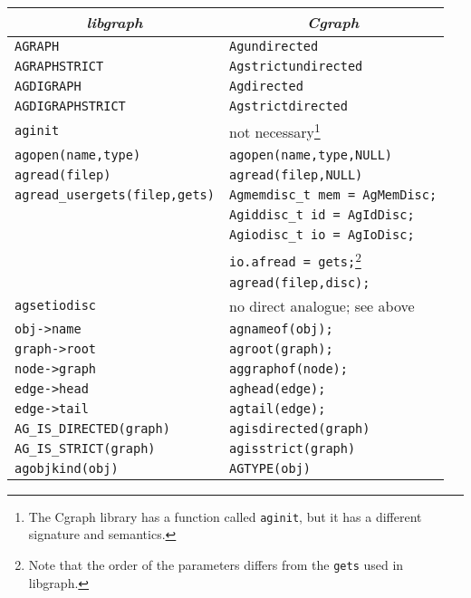 \documentclass[11pt,letterpaper]{article}
\begin{document}
\begin{savenotes}
\begin{table*}[htb]
\centering
\begin{tabular}{|l|l|} \hline
\multicolumn{1}{|c|}{\em libgraph} & \multicolumn{1}{c|}{\em Cgraph} \\ \hline
\verb"AGRAPH"  &  \verb"Agundirected" \\ \hline
\verb"AGRAPHSTRICT" &  \verb"Agstrictundirected" \\ \hline
\verb"AGDIGRAPH" &  \verb"Agdirected" \\ \hline
\verb"AGDIGRAPHSTRICT"  &  \verb"Agstrictdirected" \\ \hline
\verb"aginit" &  not necessary\footnote{The Cgraph library has a function called \texttt{aginit}, but it has a different signature and semantics.} \\ \hline
\verb"agopen(name,type)" &  \verb"agopen(name,type,NULL)"\\ \hline
\verb"agread(filep)" &  \verb"agread(filep,NULL)"\\ \hline
\verb"agread_usergets(filep,gets)" &  \verb"Agmemdisc_t mem = AgMemDisc;" \\
                            &  \verb"Agiddisc_t id = AgIdDisc;" \\
                            &  \verb"Agiodisc_t io = AgIoDisc;" \\
                            &  \verb"io.afread = gets;"\footnote{Note that the order of the parameters differs from the \texttt{gets} used in libgraph.} \\
                            &  \verb"agread(filep,disc);"\\ \hline
\verb"agsetiodisc" &  no direct analogue; see above \\ \hline
\verb"obj->name"   &  \verb"agnameof(obj);" \\ \hline
\verb"graph->root"   &  \verb"agroot(graph);" \\ \hline
\verb"node->graph"   &  \verb"aggraphof(node);" \\ \hline
\verb"edge->head"   &  \verb"aghead(edge);" \\ \hline
\verb"edge->tail"   &  \verb"agtail(edge);" \\ \hline
\verb"AG_IS_DIRECTED(graph)" &  \verb"agisdirected(graph)"  \\ \hline
\verb"AG_IS_STRICT(graph)" &  \verb"agisstrict(graph)"  \\ \hline
\verb"agobjkind(obj)" &  \verb"AGTYPE(obj)" \\ \hline

\end{tabular}
\end{table*}
\end{savenotes}
\end{document}
